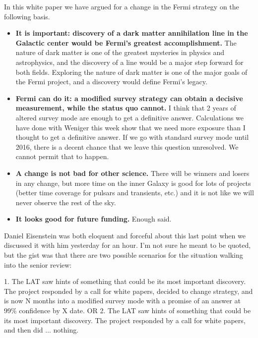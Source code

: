 \documentclass[aps,prd,superscriptaddress,showpacs,nofootinbib,fixlfloat, 12pt]{revtex4-1}
\begin{document}
In this white paper we have argued for a change in the Fermi strategy on the
following basis.

\begin{itemize}

\item{\bf It is important: discovery of a dark matter annihilation line in the
    Galactic center would be Fermi's greatest accomplishment.}  The nature of
  dark matter is one of the greatest mysteries in physics and astrophysics,
  and the discovery of a line would be a major step forward for both fields.
  Exploring the nature of dark matter is one of the major goals of the Fermi
  project, and a discovery would define Fermi's legacy.

\item{\bf Fermi can do it: a modified survey strategy can obtain a decisive
    measurement, while the status quo cannot.}  I think that 2 years of
  altered survey mode are enough to get a definitive answer.  Calculations we
  have done with Weniger this week show that we need more exposure than I
  thought to get a definitive answer.  If we go with standard survey mode
  until 2016, there is a decent chance that we leave this question unresolved.
  We cannot permit that to happen.

\item{\bf A change is not bad for other science.}  There will be winners and
  losers in any change, but more time on the inner Galaxy is good for lots of
  projects (better time coverage for pulsars and transients, etc.) and it is
  not like we will never observe the rest of the sky.

\item{\bf It looks good for future funding.}  Enough said. 

\end{itemize}

Daniel Eisenstein was both eloquent and forceful about this last point
when we discussed it with him yesterday for an hour.  I'm not sure he
meant to be quoted, but the gist was that there are two possible
scenarios for the situation walking into the senior review:

1.  The LAT saw hints of something that could be its most important
discovery.  The project responded by a call for white papers, decided
to change strategy, and is now N months into a modified survey mode
with a promise of an answer at 99\% confidence by X date.
OR
2.  The LAT saw hints of something that could be its most important
discovery.  The project responded by a call for white papers, and then
did ... nothing.
\end{document}
